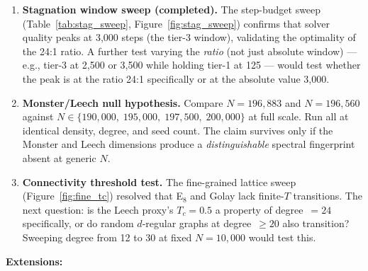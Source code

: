 \documentclass[11pt,a4paper]{article}
\begin{document}
\begin{enumerate}[nosep]
\item \textbf{Stagnation window sweep (completed).}
The step-budget sweep (Table~\ref{tab:stag_sweep}, Figure~\ref{fig:stag_sweep}) confirms that solver quality peaks at 3{,}000 steps (the tier-3 window), validating the optimality of the 24:1 ratio.
A further test varying the \emph{ratio} (not just absolute window) --- e.g., tier-3 at 2{,}500 or 3{,}500 while holding tier-1 at 125 --- would test whether the peak is at the ratio 24:1 specifically or at the absolute value 3{,}000.

\item \textbf{Monster/Leech null hypothesis.}
Compare $N = 196{,}883$ and $N = 196{,}560$ against $N \in \{190{,}000,\; 195{,}000,\; 197{,}500,\; 200{,}000\}$ at full scale.
Run all at identical density, degree, and seed count.
The claim survives only if the Monster and Leech dimensions produce a \emph{distinguishable} spectral fingerprint absent at generic $N$.

\item \textbf{Connectivity threshold test.}
The fine-grained lattice sweep (Figure~\ref{fig:fine_tc}) resolved that E$_8$ and Golay lack finite-$T$ transitions. The next question: is the Leech proxy's $T_c = 0.5$ a property of degree~$= 24$ specifically, or do random $d$-regular graphs at degree~$\geq 20$ also transition? Sweeping degree from 12 to 30 at fixed $N = 10{,}000$ would test this.
\end{enumerate}

\medskip\noindent\textbf{Extensions:}
\end{document}
